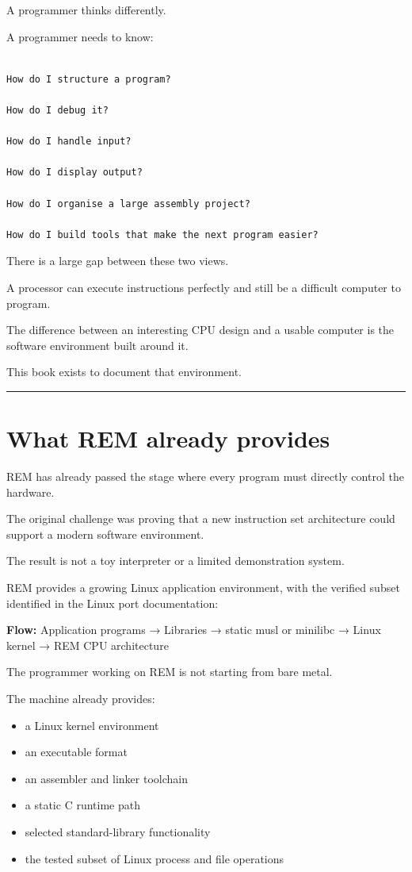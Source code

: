 \documentclass[
  oneside,
  openany]{book}
\providecommand{\tightlist}{%
  \setlength{\itemsep}{0pt}\setlength{\parskip}{0pt}}
\begin{document}
A programmer thinks differently.

A programmer needs to know:

\begin{verbatim}

How do I structure a program?

How do I debug it?

How do I handle input?

How do I display output?

How do I organise a large assembly project?

How do I build tools that make the next program easier?
\end{verbatim}

There is a large gap between these two views.

A processor can execute instructions perfectly and still be a difficult
computer to program.

The difference between an interesting CPU design and a usable computer
is the software environment built around it.

This book exists to document that environment.

\begin{center}\rule{0.5\linewidth}{0.5pt}\end{center}

\hypertarget{what-rem-already-provides}{%
\section{What REM already provides}\label{what-rem-already-provides}}

REM has already passed the stage where every program must directly
control the hardware.

The original challenge was proving that a new instruction set
architecture could support a modern software environment.

The result is not a toy interpreter or a limited demonstration system.

REM provides a growing Linux application environment, with the verified
subset identified in the Linux port documentation:

\textbf{Flow:} Application programs → Libraries → static musl or
minilibc → Linux kernel → REM CPU architecture

The programmer working on REM is not starting from bare metal.

The machine already provides:

\begin{itemize}
\tightlist
\item
  a Linux kernel environment
\item
  an executable format
\item
  an assembler and linker toolchain
\item
  a static C runtime path
\item
  selected standard-library functionality
\item
  the tested subset of Linux process and file operations
\end{itemize}
\end{document}
